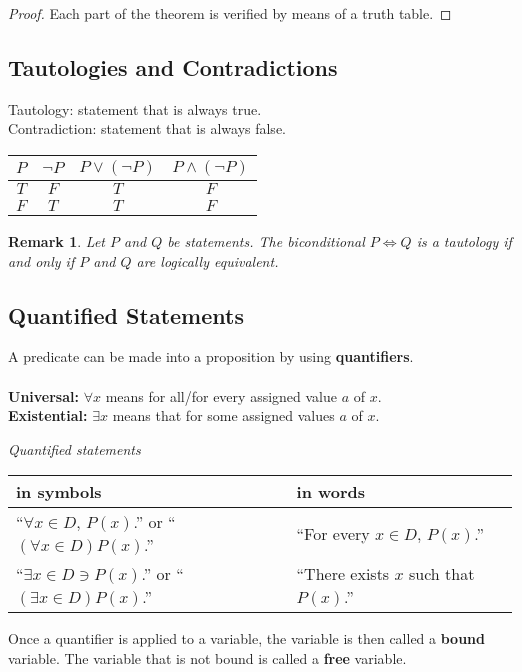 \documentclass[10pt,reqno]{book}
\theoremstyle{plain}
\newtheorem{remark}[theorem]{Remark}
\begin{document}
	\begin{proof}
		Each part of the theorem is verified by means of a truth table.
	\end{proof}
	
	\subsection*{Tautologies and Contradictions}
	
	Tautology: statement that is always true.\\
	Contradiction: statement that is always false.
	\begin{center}
		\begin{tabular}{|c|c|c|c|}
			\hline
			$ P $ & $ \neg P $ & $ P \vee (\neg P) $ & $ P \wedge (\neg P) $ \\ \hline
			$ T $ &   $ F $    &        $ T $        &         $ F $         \\ \hline
			$ F $ &   $ T $    &        $ T $        &         $ F $         \\ \hline
		\end{tabular}
	\end{center}	
	
	\begin{remark}
		Let $ P $ and $ Q $ be statements. The biconditional $ P \Leftrightarrow Q $ is a tautology if and only if $ P $ and $ Q $ are logically equivalent.
	\end{remark}
	
	\subsection*{Quantified Statements}
	
	A predicate can be made into a proposition by using \textbf{quantifiers}.\\ \\
	\textbf{Universal:} $ \forall x $ means for all/for every assigned value $ a $ of $ x $.\\
	\textbf{Existential:} $ \exists x $ means that for some assigned values $ a $ of $ x $.
	\begin{center}
		\textit{Quantified statements}
		
		\begin{tabular}{|l|l|}\hline
			in symbols & in words\\ \hline
			``$ \forall x \in D, \, P(x) $.'' or ``$ (\forall x \in D) P(x) $.'' & ``For every $ x \in D, \, P(x) $.''\\ \hline
			``$ \exists x \in D \ni P(x) $.'' or ``$ (\exists x \in D) P(x) $.'' & ``There exists $ x $ such that $ P(x) $.''\\ \hline
		\end{tabular}
	\end{center}
	Once a quantifier is applied to a variable, the variable is then called a \textbf{bound} variable. The variable that is not bound is called a \textbf{free} variable.
	
\end{document}
